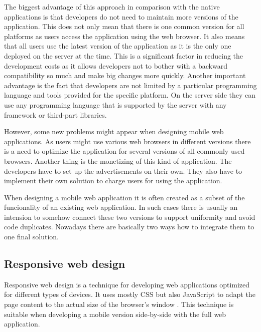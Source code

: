 \documentclass[12pt,oneside,final]{fithesis2}
\begin{document}
The biggest advantage of this approach in comparison with the native applications is that developers do not need to maintain more versions of the application.
This does not only mean that there is one common version for all platforms as users access the application using the web browser.
It also means that all users use the latest version of the application as it is the only one deployed on the server at the time.
This is a significant factor in reducing the development costs as it allows developers not to bother with a backward compatibility so much and make big changes more quickly.
Another important advantage is the fact that developers are not limited by a particular programming language and tools provided for the specific platform.
On the server side they can use any programming language that is supported by the server with any framework or third-part libraries.

However, some new problems might appear when designing mobile web applications.
As users might use various web browsers in different versions there is a need to optimize the application for several versions of all commonly used browsers.
Another thing is the monetizing of this kind of application.
The developers have to set up the advertisements on their own.
They also have to implement their own solution to charge users for using the application.

When designing a mobile web application it is often created as a subset of the funcionality of an existing web application.
In such cases there is usually an intension to somehow connect these two versions to support uniformity and avoid code duplicates.
Nowadays there are basically two ways how to integrate them to one final solution.

\subsection{Responsive web design}
Responsive web design is a technique for developing web applications optimized for different types of devices.
It uses mostly CSS but also JavaScript to adapt the page content to the actual size of the browser's window \cite{marcotte11}.
This technique is suitable when developing a mobile version side-by-side with the full web application.
\end{document}
